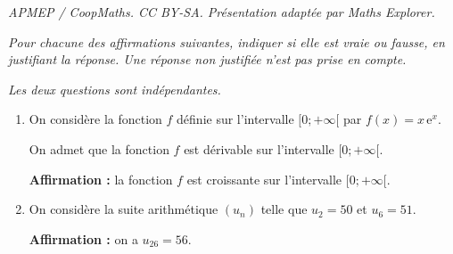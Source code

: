 \documentclass[10pt]{article}
\begin{document}
\noindent\textit{APMEP / CoopMaths. CC BY-SA. Présentation adaptée par Maths Explorer.}\par\medskip
\emph{Pour chacune des affirmations suivantes, indiquer si elle est vraie ou fausse, en justifiant la réponse. Une réponse non justifiée n'est pas prise en compte.}

\emph{Les deux questions sont indépendantes.}

\begin{enumerate}
	\item On considère la fonction $f$ définie sur l'intervalle $[0 ; +\infty[$ par $f(x) = x\,\mathrm{e}^x$.

	On admet que la fonction $f$ est dérivable sur l'intervalle $[0 ; +\infty[$.

	\textbf{Affirmation :} la fonction $f$ est croissante sur l'intervalle $[0 ; +\infty[$.

	\item On considère la suite arithmétique $\left(u_n\right)$ telle que $u_2=50$ et $u_6=51$.

	\textbf{Affirmation :} on a $u_{26}=56$.
\end{enumerate}
\end{document}
